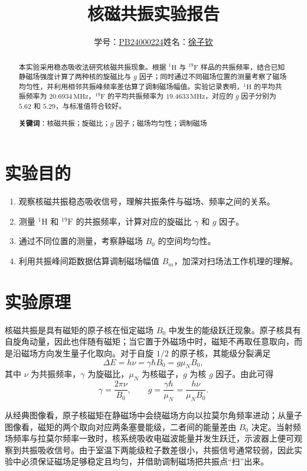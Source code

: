 \documentclass[12pt,a4paper]{article}
\title{\Huge{\textbf{核磁共振实验报告}}}
\author{\parbox{0.9\textwidth}{\centering 学号：\uline{PB24000224}\quad 姓名：\uline{徐子钦}}}
\begin{document}
\maketitle

\begin{abstract}
本实验采用稳态吸收法研究核磁共振现象。根据 $^1\mathrm{H}$ 与 $^{19}\mathrm{F}$ 样品的共振频率，结合已知静磁场强度计算了两种核的旋磁比与 $g$ 因子；同时通过不同磁场位置的测量考察了磁场均匀性，并利用相邻共振峰频率差估算了调制磁场幅值。实验记录表明，$^1\mathrm{H}$ 的平均共振频率为 $20.6934\,\mathrm{MHz}$，$^{19}\mathrm{F}$ 的平均共振频率为 $19.4633\,\mathrm{MHz}$，对应的 $g$ 因子分别为 $5.62$ 和 $5.29$，与标准值符合较好。

\textbf{关键词}：核磁共振；旋磁比；$g$ 因子；磁场均匀性；调制磁场
\end{abstract}

\section{实验目的}
\begin{enumerate}
    \item 观察核磁共振稳态吸收信号，理解共振条件与磁场、频率之间的关系。
    \item 测量 $^1\mathrm{H}$ 和 $^{19}\mathrm{F}$ 的共振频率，计算对应的旋磁比 $\gamma$ 和 $g$ 因子。
    \item 通过不同位置的测量，考察静磁场 $B_0$ 的空间均匀性。
    \item 利用共振峰间距数据估算调制磁场幅值 $B_m$，加深对扫场法工作机理的理解。
\end{enumerate}

\section{实验原理}
核磁共振是具有磁矩的原子核在恒定磁场 $B_0$ 中发生的能级跃迁现象。原子核具有自旋角动量，因此也伴随有磁矩；当它置于外磁场中时，磁矩不再取任意取向，而是沿磁场方向发生量子化取向。对于自旋 $1/2$ 的原子核，其能级分裂满足
\[
\Delta E = h\nu = \gamma \hbar B_0 = g\mu_N B_0,
\]
其中 $\nu$ 为共振频率，$\gamma$ 为旋磁比，$\mu_N$ 为核磁子，$g$ 为核 $g$ 因子。由此可得
\[
\gamma = \frac{2\pi\nu}{B_0}, \qquad g = \frac{\gamma\hbar}{\mu_N} = \frac{h\nu}{\mu_N B_0}.
\]

从经典图像看，原子核磁矩在静磁场中会绕磁场方向以拉莫尔角频率进动；从量子图像看，磁矩的两个取向对应两条塞曼能级，二者间的能量差由 $B_0$ 决定。当射频场频率与拉莫尔频率一致时，核系统吸收电磁波能量并发生跃迁，示波器上便可观察到共振吸收信号。由于室温下两能级粒子数差很小，共振信号通常较弱，因此实验中必须保证磁场足够稳定且均匀，并借助调制磁场把共振点“扫”出来。
\end{document}
